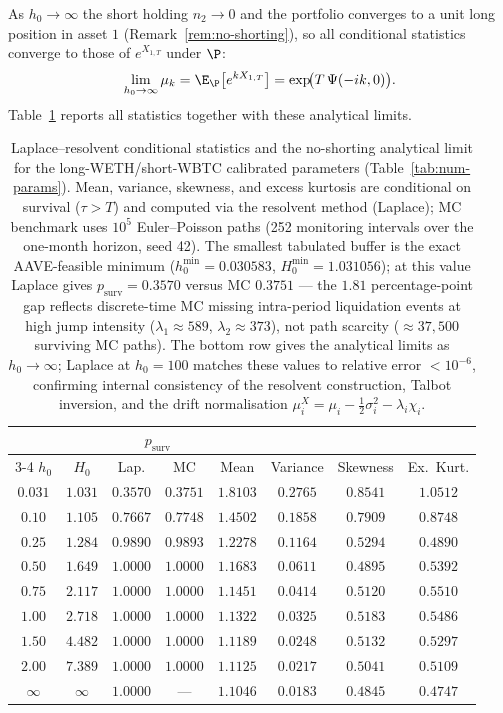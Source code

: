 As $h_0\to\infty$ the short holding $n_2\to 0$ and the portfolio converges to a unit long
position in asset $1$ (Remark~\ref{rem:no-shorting}), so all conditional statistics
converge to those of $e^{X_{1,T}}$ under $\P$:
\[
\lim_{h_0\to\infty}\mu_k = \E_\P\!\left[e^{kX_{1,T}}\right]
= \exp\!\bigl(T\,\Psi(-ik,0)\bigr).
\]
Table~\ref{tab:results} reports all statistics together with these analytical limits.

\begin{table}[ht]
\centering\small
\renewcommand{\arraystretch}{1.3}
\begin{tabular}{cc cc cccc}
\toprule
& & \multicolumn{2}{c}{$p_{\mathrm{surv}}$} & & & & \\
\cmidrule(lr){3-4}
$h_0$ & $H_0$ & Lap. & MC & Mean & Variance & Skewness & Ex.\ Kurt. \\
\midrule
$0.031$ & $1.031$ & $0.3570$ & $0.3751$ & $1.8103$ & $0.2765$ & $0.8541$ & $1.0512$ \\
$0.10$ & $1.105$ & $0.7667$ & $0.7748$ & $1.4502$ & $0.1858$ & $0.7909$ & $0.8748$ \\
$0.25$ & $1.284$ & $0.9890$ & $0.9893$ & $1.2278$ & $0.1164$ & $0.5294$ & $0.4890$ \\
$0.50$ & $1.649$ & $1.0000$ & $1.0000$ & $1.1683$ & $0.0611$ & $0.4895$ & $0.5392$ \\
$0.75$ & $2.117$ & $1.0000$ & $1.0000$ & $1.1451$ & $0.0414$ & $0.5120$ & $0.5510$ \\
$1.00$ & $2.718$ & $1.0000$ & $1.0000$ & $1.1322$ & $0.0325$ & $0.5183$ & $0.5486$ \\
$1.50$ & $4.482$ & $1.0000$ & $1.0000$ & $1.1189$ & $0.0248$ & $0.5132$ & $0.5297$ \\
$2.00$ & $7.389$ & $1.0000$ & $1.0000$ & $1.1125$ & $0.0217$ & $0.5041$ & $0.5109$ \\
\midrule
$\infty$ & $\infty$ & $1.0000$ & --- & $1.1046$ & $0.0183$ & $0.4845$ & $0.4747$ \\
\bottomrule
\end{tabular}
\caption{Laplace--resolvent conditional statistics and the no-shorting analytical limit
for the long-WETH/short-WBTC calibrated parameters (Table~\ref{tab:num-params}).
Mean, variance, skewness, and excess kurtosis are conditional on survival ($\tau>T$)
and computed via the resolvent method (Laplace); MC benchmark uses $10^5$ Euler--Poisson
paths (252 monitoring intervals over the one-month horizon, seed 42). The smallest tabulated
buffer is the exact AAVE-feasible minimum
($h_0^{\min}=0.030583$, $H_0^{\min}=1.031056$); at this value
Laplace gives $p_{\mathrm{surv}}=0.3570$
versus MC $0.3751$ --- the $1.81$ percentage-point gap reflects discrete-time MC missing intra-period
liquidation events at high jump intensity
($\lambda_1\approx589$, $\lambda_2\approx373$), not path scarcity
($\approx\!37{,}500$ surviving MC paths).
The bottom row gives the analytical limits as $h_0\to\infty$; Laplace at $h_0=100$ matches
these values to relative error $<10^{-6}$, confirming internal consistency of the
resolvent construction, Talbot inversion, and the drift normalisation
$\mu_i^X=\mu_i-\tfrac{1}{2}\sigma_i^2-\lambda_i\chi_i$.}
\label{tab:results}
\end{table}

